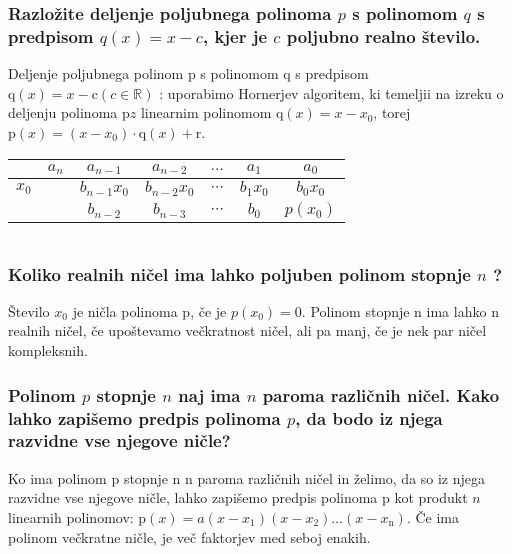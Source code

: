 \documentclass{article}
\begin{document}
\subsubsection*{Razložite deljenje poljubnega polinoma $p$ s polinomom $q$ s predpisom $q(x)=x-c$, kjer je $c$ poljubno realno število.}

Deljenje poljubnega polinom $\mathrm{p}$ s polinomom q s predpisom $\mathrm{q}(x)=x-\mathrm{c}(c \in \mathbb{R})$ : uporabimo Hornerjev algoritem, ki temeljii na izreku o deljenju polinoma $\mathrm{p} z$ linearnim polinomom $\mathrm{q}(x)=x-x_{0}$, torej $\mathrm{p}(x)=\left(x-x_{0}\right) \cdot \mathrm{q}(x)+\mathrm{r}$.

\begin{center}
\begin{tabular}{|c|c|c|c|c|c|c|}
\cline { 2 - 7 }
\multicolumn{1}{c|}{} & $a_{n}$ & $a_{n-1}$ & $a_{n-2}$ & $\ldots$ & $a_{1}$ & $a_{0}$ \\
\hline
$x_{0}$ &  & $b_{n-1} x_{0}$ & $b_{n-2} x_{0}$ & $\cdots$ & $b_{1} x_{0}$ & $b_{0} x_{0}$ \\
\hline
\multicolumn{1}{c|}{} &  & $b_{n-2}$ & $b_{n-3}$ & $\cdots$ & $b_{0}$ & $p\left(x_{0}\right)$ \\
\hline
\end{tabular}
\end{center}

\section{\texorpdfstring{}{Ničle polinomov}}
\subsubsection*{Koliko realnih ničel ima lahko poljuben polinom stopnje $n$ ?}

Število $x_{0}$ je ničla polinoma $\mathrm{p}$, če je $p\left(x_{0}\right)=0$. Polinom stopnje $\mathrm{n}$ ima lahko $\mathrm{n}$ realnih ničel, če upoštevamo večkratnost ničel, ali pa manj, če je nek par ničel kompleksnih.

\subsubsection*{Polinom $p$ stopnje $n$ naj ima $n$ paroma različnih ničel. Kako lahko zapišemo predpis polinoma $p$, da bodo iz njega razvidne vse njegove ničle?}

Ko ima polinom p stopnje $\mathrm{n}$ n paroma različnih ničel in želimo, da so iz njega razvidne vse njegove ničle, lahko zapišemo predpis polinoma $\mathrm{p}$ kot produkt $n$ linearnih polinomov: $\mathrm{p}(x)=a\left(x-x_{1}\right)\left(x-x_{2}\right) \ldots\left(x-x_{\mathrm{n}}\right)$. Če ima polinom večkratne ničle, je več faktorjev med seboj enakih.
\end{document}
